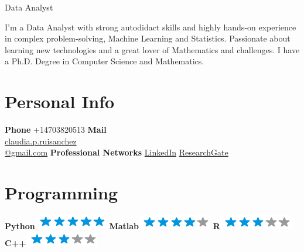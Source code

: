 \documentclass[]{friggeri-cv}
\begin{document}
      {Data Analyst}
      
I'm a Data Analyst  with strong autodidact skills and highly hands-on experience in complex problem-solving, Machine Learning and Statistics. Passionate about learning new technologies and a great lover of Mathematics and challenges. I have a Ph.D. Degree in Computer Science and Mathematics.


\begin{aside}
  \section{Personal Info}
  \textbf{Phone} +14703820513
  \textbf{Mail} \\\href{mailto:claudia.p.ruisanchez@gmail.com}{claudia.p.ruisanchez\\@gmail.com}
   \textbf{Professional Networks}
    \href{https://www.linkedin.com/in/claudiaperezruisanchez/}{LinkedIn}
    \href{https://https://www.researchgate.net/profile/Claudia_Perez59}{ResearchGate}    
  \section{Programming}
    \textbf{Python}\includegraphics[scale=0.40]{img/5stars.png}
    \textbf{Matlab}\includegraphics[scale=0.40]{img/4stars.png}
    \textbf{R}\includegraphics[scale=0.40]{img/3stars.png}
    \textbf{C++}\includegraphics[scale=0.40]{img/3stars.png}   

\end{aside}
\end{document}
